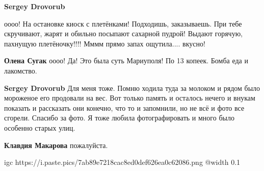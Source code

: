 \begin{itemize}
\begin{itemize}
\textbf{Sergey Drovorub} 

оооо! На остановке киоск с плетёнками! Подходишь, заказываешь. При тебе
скручивают, жарят и обильно посыпают сахарной пудрой! Выдают горячую, пахнущую
плетёночку!!!! Мммм прямо запах ощутила.... вкусно!

\textbf{Олена Сугак} оооо! Да! Это была суть Мариуполя! По 13 копеек. Бомба еда и лакомство.

\textbf{Sergey Drovorub} Для меня тоже. Помню ходила туда за молоком и рядом было мороженое его продовали на вес. Вот только память и осталось нечего и внукам показать и рассказать они конечно, что то и запомнили, но не всё и фото все сгорели. Спасибо за фото. Я тоже любила фотографировать и много было особенно старых улиц.

\textbf{Клавдия Макарова} пожалуйста.

\end{itemize} %

\end{itemize} %


\ifcmt
  igc https://i.paste.pics/7ab89e7218cac8ed0def626ea0c62086.png
	@width 0.1
\fi
